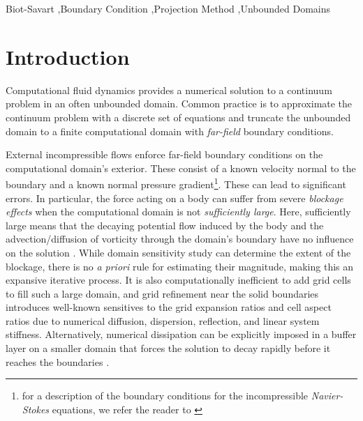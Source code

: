 \documentclass[final,1p,times]{elsarticle}
\begin{document}
\begin{frontmatter}
\begin{keyword}
Biot-Savart \sep Boundary Condition \sep Projection Method \sep Unbounded Domains
\end{keyword}

\end{frontmatter}



\section{Introduction}
Computational fluid dynamics provides a numerical solution to a continuum problem in an often unbounded domain. Common practice is to approximate the continuum problem with a discrete set of equations and truncate the unbounded domain to a finite computational domain with \emph{far-field} boundary conditions. 

External incompressible flows enforce far-field boundary conditions on the computational domain's exterior. These consist of a known velocity normal to the boundary and a known normal pressure gradient\footnote{for a description of the boundary conditions for the incompressible \emph{Navier-Stokes} equations, we refer the reader to \cite{Gresho1987}}. These can lead to significant errors. In particular, the force acting on a body can suffer from severe \emph{blockage effects} when the computational domain is not \emph{sufficiently large}. Here, sufficiently large means that the decaying potential flow induced by the body and the advection/diffusion of vorticity through the domain's boundary have no influence on the solution \cite{Colonius2008}. While domain sensitivity study can determine the extent of the blockage, there is no \emph{a priori} rule for estimating their magnitude, making this an expansive iterative process. It is also computationally inefficient to add grid cells to fill such a large domain, and grid refinement near the solid boundaries introduces well-known sensitives to the grid expansion ratios and cell aspect ratios due to numerical diffusion, dispersion, reflection, and linear system stiffness. Alternatively, numerical dissipation can be explicitly imposed in a buffer layer on a smaller domain that forces the solution to decay rapidly before it reaches the boundaries \cite{Colonius2002ADomains}.
\end{document}

